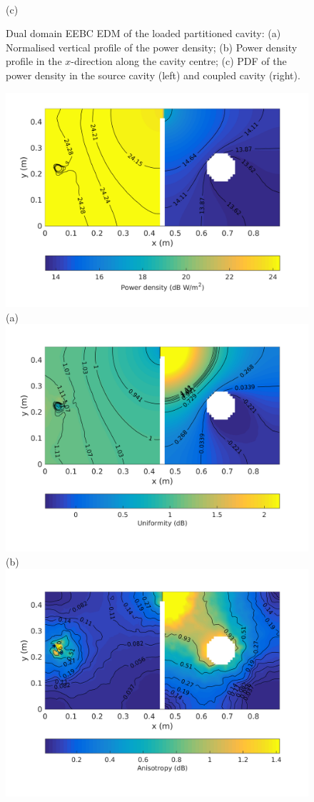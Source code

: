 \documentclass[a4paper]{article}
\numberwithin{equation}{section}
\begin{document}
\begin{figure}[ht]
\begin{center}
\\
{\footnotesize (c)}\\
\vspace{-2mm}
\caption{\label{fg:partcylddm_profs} Dual domain EEBC EDM of the loaded partitioned cavity: (a) Normalised vertical profile of the power density; 
(b) Power density profile in the $x$-direction along the cavity centre; (c) PDF of the power density in the source cavity (left) and coupled cavity (right).}
\end{center}
\end{figure}

\begin{figure}[ht]
\begin{center}
\includegraphics[trim={0 8mm 0 12mm},clip,width=0.52\linewidth]{figures/DDM-EEBC_3D_DL_PowerDensityMap}\\
{\footnotesize (a)}\\
\vspace{2mm}
\includegraphics[trim={0 8mm 0 12mm},clip,width=0.52\linewidth]{figures/DDM-EEBC_3D_DL_EnergyDensityUniformityMap}\\
{\footnotesize (b)}\\
\vspace{2mm}
\includegraphics[trim={0 8mm 0 12mm},clip,width=0.52\linewidth]{figures/DDM-EEBC_3D_DL_EnergyDensityAnisotropyMap}\\

\end{center}
\end{figure}
\end{document}
